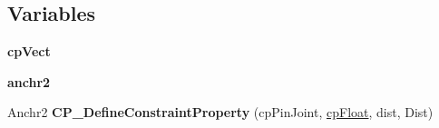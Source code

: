 \subsection*{Variables}
\begin{DoxyCompactItemize}
\item 
\hypertarget{group__cp_pin_joint_gae5bb48004c89589d2d4b8008db38754e}{{\bfseries cp\-Vect}}\label{group__cp_pin_joint_gae5bb48004c89589d2d4b8008db38754e}

\item 
\hypertarget{group__cp_pin_joint_gaed362236d55092056b72ea837860308b}{{\bfseries anchr2}}\label{group__cp_pin_joint_gaed362236d55092056b72ea837860308b}

\item 
\hypertarget{group__cp_pin_joint_gae9126a0b6fa71b9f2ea4959c4ac34420}{Anchr2 {\bfseries C\-P\-\_\-\-Define\-Constraint\-Property} (cp\-Pin\-Joint, \hyperlink{group__basic_types_gac1ed65573e035bf892505768c852d8d3}{cp\-Float}, dist, Dist)}\label{group__cp_pin_joint_gae9126a0b6fa71b9f2ea4959c4ac34420}

\end{DoxyCompactItemize}
